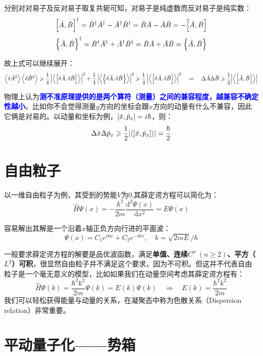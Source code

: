 分别对对易子及反对易子取复共轭可知，对易子是纯虚数而反对易子是纯实数：
\[\comm{\hat{A}}{\hat{B}}^{\dagger}=\hat{B}^{\dagger}\hat{A}^{\dagger}-\hat{A}^{\dagger}\hat{B}^{\dagger}=\hat{B}\hat{A}-\hat{A}\hat{B}=-\comm{\hat{A}}{\hat{B}}\]
\[\qty{\hat{A},\hat{B}}^{\dagger}=\hat{B}^{\dagger}\hat{A}^{\dagger}+\hat{A}^{\dagger}\hat{B}^{\dagger}=\hat{B}\hat{A}+\hat{A}\hat{B}=\qty{\hat{A},\hat{B}}\]

故上式可以继续展开：
\[\left \langle \delta\hat{A}^2 \right \rangle\left \langle \delta\hat{B}^2 \right \rangle \geqslant \frac{1}{4} \left | \left \langle \comm{\delta\hat{A}}{\delta\hat{B}} \right \rangle \right |^2 +\frac{1}{4} \left |\left \langle \qty{\delta\hat{A},\delta\hat{B}} \right \rangle \right |^2 \geqslant \frac{1}{4} \left | \left \langle \comm{\delta\hat{A}}{\delta\hat{B}} \right \rangle \right |^2 \quad \Rightarrow \quad \Delta \hat{A}\Delta \hat{B} \geqslant \frac{1}{2}\qty|\left \langle \comm{\hat{A}}{\hat{B}} \right \rangle|\]

物理上认为\textcolor{blue}{\textbf{测不准原理提供的是两个算符（测量）之间的兼容程度，越兼容不确定性越小}}。比如你不会觉得测量$y$方向的坐标会跟$x$方向的动量有什么不兼容，因此它俩是对易的。以动量和坐标为例，$\comm{\hat{x}}{\hat{p}_x}=i\hbar$，则：
\[\Delta \hat{x}\Delta \hat{p}_x \geqslant \frac{1}{2}\qty|\left \langle \comm{\hat{x}}{\hat{p}_x} \right \rangle|=\frac{\hbar}{2}\]

\section{自由粒子}
以一维自由粒子为例，其受到的势能$V$为0,其薛定谔方程可以简化为：
\[\hat{H}\varPsi(x)=-\frac{\hbar^2}{2m}\frac{\mathrm{d}^2\varPsi(x)}{\mathrm{d}x^2}=E\varPsi(x)\]

容易解出其解是一个沿着$x$轴正负方向行进的平面波：
\[\varPsi(x)=C_1e^{ikx}+C_2e^{-ikx}, \quad k=\sqrt{2mE}/\hbar\]

一般要求薛定谔方程的解要是品优波函数，满足\textbf{单值、连续$C^n \ (n \geq 2)$、平方（$L^2$）可积}，很显然自由粒子并不满足这个要求，因为不可积。但这并不代表自由粒子是一个毫无意义的模型，比如如果我们在动量空间考虑其薛定谔方程有：
\[\hat{H}\varPsi(k)=\frac{\hbar^2k^2}{2m}\varPsi(k)=E(k)\varPsi(k) \quad \Rightarrow \quad E(k)=\frac{\hbar^2k^2}{2m}\]
我们可以轻松获得能量与动量的关系，在凝聚态中称为色散关系（Dispersion relation）非常重要。
\section{平动量子化——势箱}
